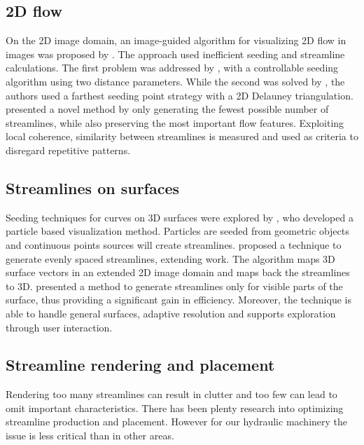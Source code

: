 \subsection{2D flow}

On the 2D image domain, an image-guided algorithm for visualizing 2D flow in images was proposed by \cite{Turk1996}.
The approach used inefficient seeding and streamline calculations.
The first problem was addressed by \cite{Jobard1997}, with a controllable seeding algorithm using two distance parameters.
While the second was solved by \cite{Mebarki2005}, the authors used a farthest seeding point strategy with a 2D Delauney triangulation.
\cite{Li2008} presented a novel method by only generating the fewest possible number of streamlines, while also preserving the most important flow features.
Exploiting local coherence, similarity between streamlines is measured and used as criteria to disregard repetitive patterns.

\subsection{Streamlines on surfaces}

Seeding techniques for curves on 3D surfaces were explored by \cite{VanWijk1992}, who developed a particle based visualization method.
Particles are seeded from geometric objects and continuous points sources will create streamlines.
\cite{Mao1998} proposed a technique to generate evenly spaced streamlines, extending \cite{Turk1996} work.
The algorithm maps 3D surface vectors in an extended 2D image domain and maps back the streamlines to 3D. 
\cite{Spencer2009} presented a method to generate streamlines only for visible parts of the surface, thus providing a significant gain in efficiency.
Moreover, the technique is able to handle general surfaces, adaptive resolution and supports exploration through user interaction.

\subsection{Streamline rendering and placement}

Rendering too many streamlines can result in clutter and too few can lead to omit important characteristics.
There has been plenty research into optimizing streamline production and placement.
However for our hydraulic machinery the issue is less critical than in other areas.

